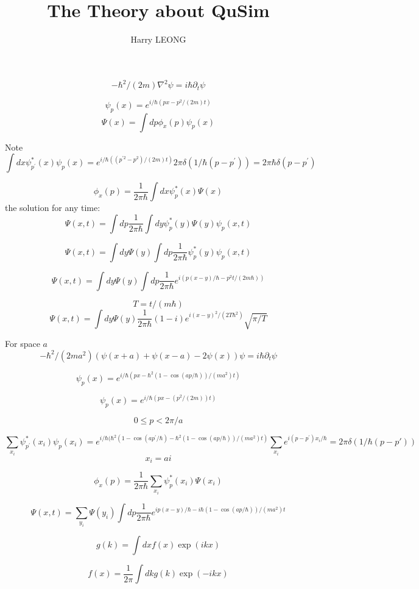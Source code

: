 \documentclass[12pt,twoside]{article}
\begin{document}
\title{The Theory about QuSim}
\author{Harry LEONG}

\maketitle

$$
-\hbar^2/(2m) \nabla^2 \psi = i \hbar \partial_t \psi
$$

$$
\psi_p(x) = e^{ i/\hbar (p x - p^2 /(2m)t)}
$$
$$
\Psi(x) = \int dp \phi_x(p) \psi_p(x)
$$

Note
$$
\int dx \psi_{p^\prime}^*(x) \psi_{p}(x) = e^{ i/\hbar ((p^{\prime2} - p^2) /(2m)t)} 2\pi\delta(1/\hbar(p-p^\prime))
=2\pi\hbar\delta(p-p^\prime)
$$

$$
\phi_x(p) = \frac{1}{2\pi\hbar}\int dx \psi^*_p(x) \Psi(x)
$$
the solution for any time:
$$
\Psi(x, t) = \int dp \frac{1}{2\pi\hbar}\int dy \psi^*_p(y) \Psi(y) \psi_p(x,t)
$$

$$
\Psi(x, t) = \int dy  \Psi(y) \int dp \frac{1}{2\pi\hbar}\psi^*_p(y) \psi_p(x,t)
$$

$$
\Psi(x, t) = \int dy  \Psi(y) \int dp \frac{1}{2\pi\hbar} e^{i(p(x-y)/\hbar - p^2 t/(2m\hbar))}
$$

$$
T=t/(m\hbar)
$$
$$
\Psi(x, t) = \int dy  \Psi(y) \frac{1}{2\pi\hbar} (1-i) e^{i (x-y)^2 / (2 T \hbar^2)}  \sqrt{\pi / T}
$$


For space $a$
$$
-\hbar^2/(2m a^2) (\psi(x+a) + \psi(x-a) - 2\psi(x)) \psi = i \hbar \partial_t \psi
$$

$$
\psi_p(x) = e^{ i/\hbar (p x - \hbar^2(1 - \cos(a p/\hbar))/(m a^2)t)}
$$

$$
\psi_p(x) = e^{ i/\hbar (p x - (p^2/(2m))t)}
$$

$$
0 \le p < 2\pi / a
$$

$$
\sum_{x_i} \psi_{p^\prime}^*(x_i) \psi_{p}(x_i) = e^{ i/\hbar (\hbar^2(1 - \cos(a p^\prime/\hbar) - \hbar^2(1 - \cos(a p/\hbar))/(m a^2)t)}
\sum_{x_i}e^{i(p-p^\prime)x_i/\hbar} = 2\pi\delta(1/\hbar(p - p\prime))
$$
$$
x_i = ai
$$

$$
\phi_x(p) = \frac{1}{2\pi\hbar}\sum_{x_i} \psi^*_p(x_i) \Psi(x_i)
$$

$$
\Psi(x, t) = \sum_{y_i} \Psi(y_i) \int dp \frac{1}{2\pi\hbar} e^{ ip(x-y)/\hbar - i\hbar(1 - \cos(a p/\hbar))/(m a^2)t}
$$



$$
g(k) = \int dx f(x) \exp(ikx)
$$

$$
f(x) = \frac{1}{2\pi}\int dk g(k) \exp(-ikx)
$$
\end{document}

